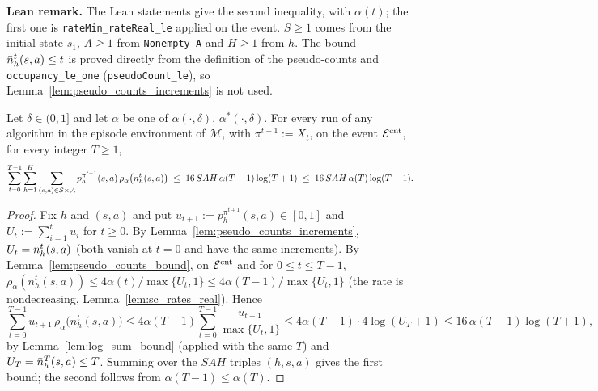 \textbf{Lean remark.} The Lean statements give the second inequality, with $\alpha(t)$; the first
one is \texttt{rateMin\_rateReal\_le} applied on the event. $S \ge 1$ comes from the initial state $s_1$,
$A \ge 1$ from \texttt{Nonempty A} and $H \ge 1$ from $h$. The bound $\bar{n}_h^t(s,a) \le t$ is proved
directly from the definition of the pseudo-counts and \texttt{occupancy\_le\_one}
(\texttt{pseudoCount\_le}), so Lemma~\ref{lem:pseudo_counts_increments} is not used.

\begin{lemma}\label{lem:sum_counts_bound}
\leanok
Let $\delta \in (0,1]$ and let $\alpha$ be one of $\alpha(\cdot,\delta)$, $\alpha^*(\cdot,\delta)$.
For every run of any algorithm in the episode environment of $\mathcal M$, with
$\pi^{t+1} := X_t$, on the event $\mathcal{E}^{\mathrm{cnt}}$, for every integer $T \ge 1$,
\[
  \sum_{t=0}^{T-1}\sum_{h=1}^H\sum_{(s,a)\in\mathcal{S}\times\mathcal{A}} p^{\pi^{t+1}}_h(s,a)\,\rho_\alpha\big(n_h^t(s,a)\big)
  \;\le\; 16\, S A H\, \alpha(T-1)\log(T+1) \;\le\; 16\, SAH\,\alpha(T)\log(T+1) .
\]
\end{lemma}

\begin{proof}
\leanok
{}
Fix $h$ and $(s,a)$ and put $u_{t+1} := p^{\pi^{t+1}}_h(s,a) \in [0,1]$ and
$U_t := \sum_{i=1}^t u_i$ for $t \ge 0$. By Lemma~\ref{lem:pseudo_counts_increments},
$U_t = \bar{n}_h^t(s,a)$ (both vanish at $t = 0$ and have the same increments). By
Lemma~\ref{lem:pseudo_counts_bound}, on $\mathcal{E}^{\mathrm{cnt}}$ and for $0 \le t \le T-1$,
$\rho_\alpha(n_h^t(s,a)) \le 4\alpha(t)/\max\{U_t,1\} \le 4\alpha(T-1)/\max\{U_t,1\}$ (the rate
is nondecreasing, Lemma~\ref{lem:sc_rates_real}). Hence
\[
  \sum_{t=0}^{T-1} u_{t+1}\,\rho_\alpha\big(n_h^t(s,a)\big) \le 4\alpha(T-1)\sum_{t=0}^{T-1}\frac{u_{t+1}}{\max\{U_t,1\}}
  \le 4\alpha(T-1)\cdot 4\log(U_T + 1) \le 16\,\alpha(T-1)\log(T+1),
\]
by Lemma~\ref{lem:log_sum_bound} (applied with the same $T$) and
$U_T = \bar{n}_h^T(s,a) \le T$. Summing over the $SAH$ triples $(h, s, a)$ gives the first bound;
the second follows from $\alpha(T-1) \le \alpha(T)$.
\end{proof}

